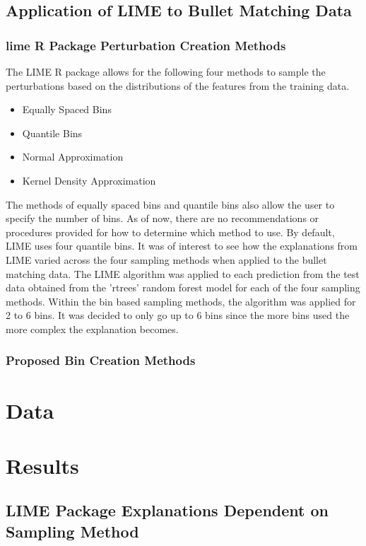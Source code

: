 \documentclass[AMS,STIX1COL]{WileyNJD-v2}
\begin{document}
\subsection{Application of LIME to Bullet Matching Data}

\subsubsection{lime R Package Perturbation Creation Methods}

The LIME R package allows for the following four methods to sample the perturbations based on the distributions of the features from the training data.

\begin{itemize}
\item Equally Spaced Bins
\item Quantile Bins
\item Normal Approximation
\item Kernel Density Approximation
\end{itemize}

The methods of equally spaced bins and quantile bins also allow the user to specify the number of bins. As of now, there are no recommendations or procedures provided for how to determine which method to use. By default, LIME uses four quantile bins. It was of interest to see how the explanations from LIME varied across the four sampling methods when applied to the bullet matching data. The LIME algorithm was applied to each prediction from the test data obtained from the 'rtrees' random forest model for each of the four sampling methods. Within the bin based sampling methods, the algorithm was applied for 2 to 6 bins. It was decided to only go up to 6 bins since the more bins used the more complex the explanation becomes.

\subsubsection{Proposed Bin Creation Methods}

\section{Data}

\section{Results}

\subsection{LIME Package Explanations Dependent on Sampling Method}
\end{document}
